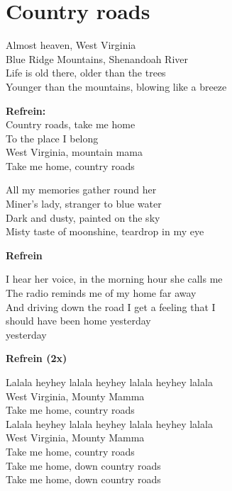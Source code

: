 \section{Country roads}
Almost heaven, West Virginia \\
Blue Ridge Mountains, Shenandoah River\\
Life is old there, older than the trees\\
Younger than the mountains, blowing like a breeze

\textbf{Refrein:}\\
Country roads, take me home\\
To the place I belong\\
West Virginia, mountain mama\\
Take me home, country roads

All my memories gather round her\\
Miner's lady, stranger to blue water\\
Dark and dusty, painted on the sky\\
Misty taste of moonshine, teardrop in my eye

\textbf{Refrein}

I hear her voice, in the morning hour she calls me\\
The radio reminds me of my home far away\\
And driving down the road I get a feeling that I\\
should have been home yesterday\\
yesterday

\textbf{Refrein (2x)}

Lalala heyhey lalala heyhey lalala heyhey lalala\\
West Virginia, Mounty Mamma\\
Take me home, country roads\\
Lalala heyhey lalala heyhey lalala heyhey lalala\\
West Virginia, Mounty Mamma\\
Take me home, country roads\\

Take me home, down country roads\\
Take me home, down country roads
